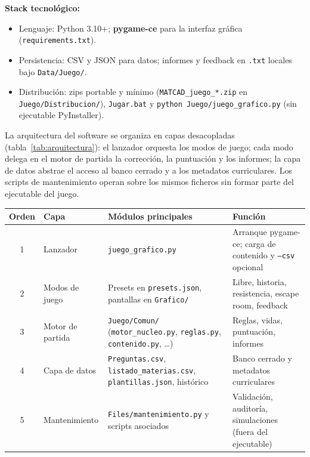 \documentclass[11pt,a4paper]{article}
\newcommand{\iniciotabla}{\par\medskip\renewcommand{\arraystretch}{1.12}}
\newcommand{\fintabla}{\par\medskip}
\begin{document}
\textbf{Stack tecnológico:}
\begin{itemize}
  \item Lenguaje: Python 3.10+; \textbf{pygame-ce} para la interfaz gráfica (\texttt{requirements.txt}).
  \item Persistencia: CSV y JSON para datos; informes y feedback en \texttt{.txt} locales bajo \texttt{Data/Juego/}.
  \item Distribución: zips portable y mínimo (\texttt{MATCAD\_juego\_*.zip} en \texttt{Juego/Distribucion/}), \texttt{Jugar.bat} y \texttt{python Juego/juego\_grafico.py} (sin ejecutable PyInstaller).
\end{itemize}

La arquitectura del software se organiza en capas desacopladas (tabla~\ref{tab:arquitectura}): el lanzador orquesta los modos de juego; cada modo delega en el motor de partida la corrección, la puntuación y los informes; la capa de datos abstrae el acceso al banco cerrado y a los metadatos curriculares. Los scripts de mantenimiento operan sobre los mismos ficheros sin formar parte del ejecutable del juego.

\iniciotabla
\begin{tabularx}{\linewidth}{@{}c>{\raggedright\arraybackslash}p{2.4cm}>{\raggedright\arraybackslash}p{4.2cm}>{\raggedright\arraybackslash}X@{}}
\toprule
\textbf{Orden} & \textbf{Capa} & \textbf{Módulos principales} & \textbf{Función} \\
\midrule
1 & Lanzador & \texttt{juego\_grafico.py} & Arranque pygame-ce; carga de contenido y \texttt{--csv} opcional \\
2 & Modos de juego & Presets en \texttt{presets.json}, pantallas en \texttt{Grafico/} & Libre, historia, resistencia, escape room, feedback \\
3 & Motor de partida & \texttt{Juego/Comun/} (\texttt{motor\_nucleo.py}, \texttt{reglas.py}, \texttt{contenido.py}, \ldots) & Reglas, vidas, puntuación, informes \\
4 & Capa de datos & \texttt{Preguntas.csv}, \texttt{listado\_materias.csv}, \texttt{plantillas.json}, histórico & Banco cerrado y metadatos curriculares \\
5 & Mantenimiento & \texttt{Files/mantenimiento.py} y scripts asociados & Validación, auditoría, simulaciones (fuera del ejecutable) \\
\bottomrule
\end{tabularx}
\label{tab:arquitectura}
\fintabla
\end{document}
